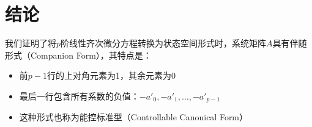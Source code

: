 \documentclass[12pt,a4paper]{article}
\begin{document}
\section{结论}

我们证明了将$p$阶线性齐次微分方程转换为状态空间形式时，系统矩阵$A$具有伴随形式（Companion Form），其特点是：
\begin{itemize}
\item 前$p-1$行的上对角元素为1，其余元素为0
\item 最后一行包含所有系数的负值：$-a'_0, -a'_1, \ldots, -a'_{p-1}$
\item 这种形式也称为能控标准型（Controllable Canonical Form）
\end{itemize}
\end{document}
